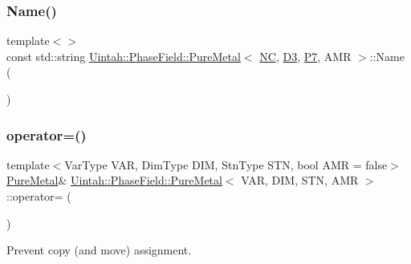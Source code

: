 \subsubsection{\texorpdfstring{Name()}{Name()}\hspace{0.1cm}{\footnotesize\ttfamily [8/8]}}
{\footnotesize\ttfamily template$<$$>$ \\
const std\+::string \hyperlink{classUintah_1_1PhaseField_1_1PureMetal}{Uintah\+::\+Phase\+Field\+::\+Pure\+Metal}$<$ \hyperlink{namespaceUintah_1_1PhaseField_a33d355affda78a83f45755ba8388cedda77924170fe82bfd58b74ca3e44139718}{NC}, \hyperlink{namespaceUintah_1_1PhaseField_a12bfc68444894dffdf0cb8d9cf0cc76aa72fd61934c7ca788c49ad90629f76e78}{D3}, \hyperlink{namespaceUintah_1_1PhaseField_a24d833a720598df1020f5cc2e75f8702a099a5b9a00f5644bb917fdec6afd8768}{P7}, A\+MR $>$\+::Name (\begin{DoxyParamCaption}{ }\end{DoxyParamCaption})}

\mbox{\label{classUintah_1_1PhaseField_1_1PureMetal_aeaab635605e3741a522eae4a6be245ee}} 
\subsubsection{\texorpdfstring{operator=()}{operator=()}}
{\footnotesize\ttfamily template$<$Var\+Type V\+AR, Dim\+Type D\+IM, Stn\+Type S\+TN, bool A\+MR = false$>$ \\
\hyperlink{classUintah_1_1PhaseField_1_1PureMetal}{Pure\+Metal}\& \hyperlink{classUintah_1_1PhaseField_1_1PureMetal}{Uintah\+::\+Phase\+Field\+::\+Pure\+Metal}$<$ V\+AR, D\+IM, S\+TN, A\+MR $>$\+::operator= (\begin{DoxyParamCaption}\item[{const \hyperlink{classUintah_1_1PhaseField_1_1PureMetal}{Pure\+Metal}$<$ V\+AR, D\+IM, S\+TN, A\+MR $>$ \&}]{ }\end{DoxyParamCaption})\hspace{0.3cm}{\ttfamily [delete]}}



Prevent copy (and move) assignment. 

\mbox{\label{classUintah_1_1PhaseField_1_1PureMetal_a2a7b57e07c20ed1a745904886da00323}} 
